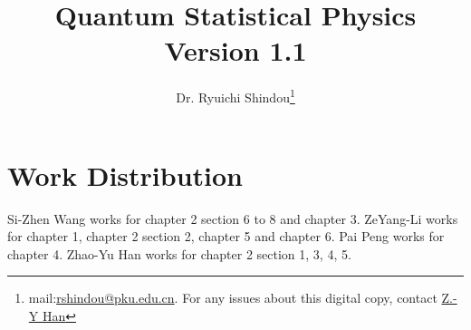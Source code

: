 \documentclass[twoside]{book}
\numberwithin{equation}{section}
\begin{document}
\title{Quantum Statistical Physics\\\normalsize Version 1.1}
\author{Dr. Ryuichi Shindou\footnote{mail:\href{mailto:rshindou@pku.edu.cn}{rshindou@pku.edu.cn}. For any issues about this digital copy, contact \href{heinsius@pku.edu.cn}{Z.-Y Han}}}
\maketitle


\tableofcontents











\newpage

\chapter*{Work Distribution}
Si-Zhen Wang works for chapter 2 section 6 to 8 and chapter 3. ZeYang-Li works for chapter 1, chapter 2 section 2, chapter 5 and chapter 6. Pai Peng works for chapter 4. Zhao-Yu Han works for chapter 2 section 1, 3, 4, 5. 
\end{document}
